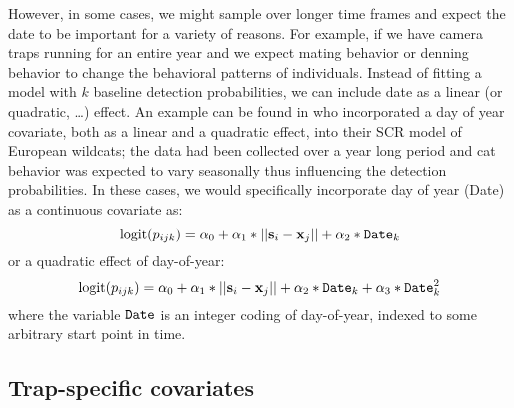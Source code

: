 However, in some cases, we might sample over longer time frames and
expect the date to be important for a variety of reasons.  For
example, if we have camera traps running for an entire year and we
expect mating behavior or denning behavior to change the behavioral
patterns of individuals. Instead of fitting a model with $k$ baseline
detection probabilities, we can include date as a linear (or
quadratic, \ldots) effect. An example can be found in
\citet{kery_etal:2011} who incorporated a day of year covariate, both
as a linear and a quadratic effect, into their SCR model of European
wildcats; the data had been collected over a year long period and cat
behavior was expected to vary seasonally thus influencing the
detection probabilities.  In these cases, we would specifically
incorporate day of year (Date) as a continuous covariate as:
\[
\mbox{logit}(p_{ijk}) = \alpha_0 + \alpha_1*||{\bf s}_{i}-{\bf x}_{j}|| + \alpha_2*\mbox{\tt Date}_{k}
\]
or a quadratic effect of day-of-year:
\[
\mbox{logit}(p_{ijk}) = \alpha_0 + \alpha_1*||{\bf s}_{i}-{\bf x}_{j}|| +
\alpha_2*\mbox{\tt Date}_{k}
 + \alpha_3*\mbox{\tt Date}_{k}^{2}
\]
where the variable $\mbox{\tt Date}$ is an integer coding of
day-of-year, indexed to some arbitrary start point in time.

\subsection{Trap-specific covariates}

